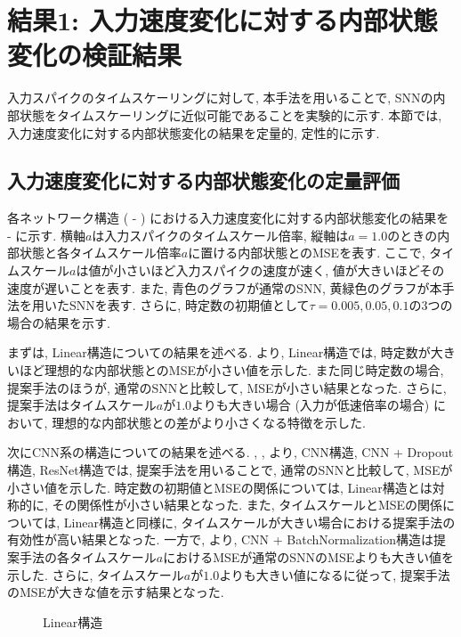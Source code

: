 
\section{結果1: 入力速度変化に対する内部状態変化の検証結果} \label{sec:result1}
入力スパイクのタイムスケーリングに対して, 本手法を用いることで, SNNの内部状態をタイムスケーリングに近似可能であることを実験的に示す.
本節では, 入力速度変化に対する内部状態変化の結果を定量的, 定性的に示す.

\subsection{入力速度変化に対する内部状態変化の定量評価}
各ネットワーク構造 ( - ) における入力速度変化に対する内部状態変化の結果を -  に示す.
横軸$a$は入力スパイクのタイムスケール倍率, 縦軸は$a=1.0$のときの内部状態と各タイムスケール倍率$a$に置ける内部状態とのMSEを表す.
ここで, タイムスケール$a$は値が小さいほど入力スパイクの速度が速く, 値が大きいほどその速度が遅いことを表す.
また, 青色のグラフが通常のSNN, 黄緑色のグラフが本手法を用いたSNNを表す.
さらに, 時定数の初期値として$\tau=0.005, 0.05, 0.1$の3つの場合の結果を示す.

まずは, Linear構造についての結果を述べる.
より, Linear構造では, 時定数が大きいほど理想的な内部状態とのMSEが小さい値を示した.
また同じ時定数の場合, 提案手法のほうが, 通常のSNNと比較して, MSEが小さい結果となった.
さらに, 提案手法はタイムスケール$a$が$1.0$よりも大きい場合 (入力が低速倍率の場合) において, 理想的な内部状態との差がより小さくなる特徴を示した.

次にCNN系の構造についての結果を述べる.
, , より, CNN構造, CNN + Dropout構造, ResNet構造では, 提案手法を用いることで, 通常のSNNと比較して, MSEが小さい値を示した.
時定数の初期値とMSEの関係については, Linear構造とは対称的に, その関係性が小さい結果となった.
また, タイムスケールとMSEの関係については, Linear構造と同様に, タイムスケールが大きい場合における提案手法の有効性が高い結果となった.
一方で, より, CNN + BatchNormalization構造は提案手法の各タイムスケール$a$におけるMSEが通常のSNNのMSEよりも大きい値を示した.
さらに, タイムスケール$a$が$1.0$よりも大きい値になるに従って, 提案手法のMSEが大きな値を示す結果となった.
\begin{figure}[htb]
    \centering
    
    \caption{Linear構造}
    \label{fig:result1:1:linear}
\end{figure}

